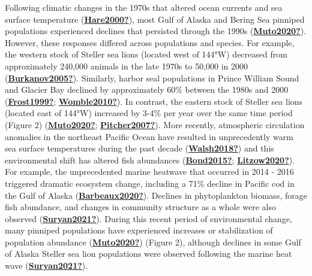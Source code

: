 \documentclass [11pt, proquest] {uwthesis}[2015/03/03]
\begin{document}
Following climatic changes in the 1970s that altered ocean currents and sea surface temperature (\protect\hyperlink{ref-Hare2000}{\textbf{Hare2000?}}), most Gulf of Alaska and Bering Sea pinniped populations experienced declines that persisted through the 1990s (\protect\hyperlink{ref-Muto2020}{\textbf{Muto2020?}}). However, these responses differed across populations and species. For example, the western stock of Steller sea lions (located west of 144°W) decreased from approximately 240,000 animals in the late 1970s to 50,000 in 2000 (\protect\hyperlink{ref-Burkanov2005}{\textbf{Burkanov2005?}}). Similarly, harbor seal populations in Prince William Sound and Glacier Bay declined by approximately 60\% between the 1980s and 2000 (\protect\hyperlink{ref-Frost1999}{\textbf{Frost1999?}}; \protect\hyperlink{ref-Womble2010}{\textbf{Womble2010?}}). In contrast, the eastern stock of Steller sea lions (located east of 144°W) increased by 3-4\% per year over the same time period (Figure 2) (\protect\hyperlink{ref-Muto2020}{\textbf{Muto2020?}}; \protect\hyperlink{ref-Pitcher2007}{\textbf{Pitcher2007?}}). More recently, atmospheric circulation anomalies in the northeast Pacific Ocean have resulted in unprecedently warm sea surface temperatures during the past decade (\protect\hyperlink{ref-Walsh2018}{\textbf{Walsh2018?}}) and this environmental shift has altered fish abundances (\protect\hyperlink{ref-Bond2015}{\textbf{Bond2015?}}; \protect\hyperlink{ref-Litzow2020}{\textbf{Litzow2020?}}). For example, the unprecedented marine heatwave that occurred in 2014 - 2016 triggered dramatic ecosystem change, including a 71\% decline in Pacific cod in the Gulf of Alaska (\protect\hyperlink{ref-Barbeaux2020}{\textbf{Barbeaux2020?}}). Declines in phytoplankton biomass, forage fish abundance, and changes in community structure as a whole were also observed (\protect\hyperlink{ref-Suryan2021}{\textbf{Suryan2021?}}). During this recent period of environmental change, many pinniped populations have experienced increases or stabilization of population abundance (\protect\hyperlink{ref-Muto2020}{\textbf{Muto2020?}}) (Figure 2), although declines in some Gulf of Alaska Steller sea lion populations were observed following the marine heat wave (\protect\hyperlink{ref-Suryan2021}{\textbf{Suryan2021?}}).
\end{document}
